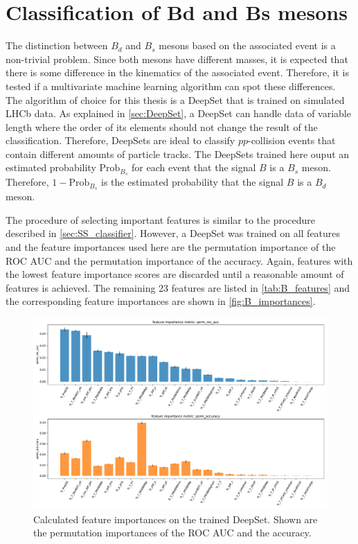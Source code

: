 \section{Classification of Bd and Bs mesons}

The distinction between $B_d$ and $B_s$ mesons based on the associated event is a non-trivial problem.
Since both mesons have different masses, it is expected that there is some difference in the kinematics of the associated event.
Therefore, it is tested if a multivariate machine learning algorithm can spot these differences.
The algorithm of choice for this thesis is a DeepSet that is trained on simulated LHCb data.
As explained in \autoref{sec:DeepSet}, a DeepSet can handle data of variable length where the order of its elements should not change the result of the classification.
Therefore, DeepSets are ideal to classify $pp$-collision events that contain different amounts of particle tracks.
The DeepSets trained here ouput an estimated probability $\text{Prob}_{B_s}$ for each event that the signal $B$ is a $B_s$ meson.
Therefore, $1-\text{Prob}_{B_s}$ is the estimated probability that the signal $B$ is a $B_d$ meson.

The procedure of selecting important features is similar to the procedure described in \autoref{sec:SS_classifier}.
However, a DeepSet was trained on all features and the feature importances used here are the permutation importance of the ROC AUC and the permutation importance of the accuracy.
Again, features with the lowest feature importance scores are discarded until a reasonable amount of features is achieved.
The remaining 23 features are listed in \autoref{tab:B_features} and the corresponding feature importances are shown in \autoref{fig:B_importances}.

\begin{figure}
    \centering
    \includegraphics[width=\textwidth]{images/B_feature_importances.pdf}
    \caption{Calculated feature importances on the trained DeepSet. Shown are the permutation importances of the ROC AUC and the accuracy.}
    \label{fig:B_importances}
\end{figure}

